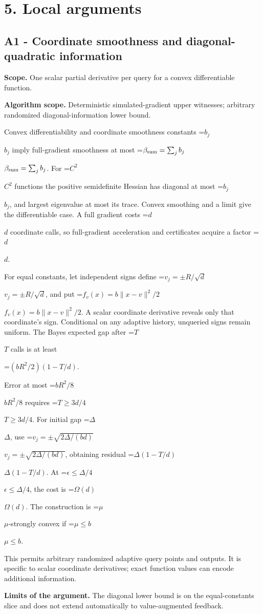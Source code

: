 \documentclass[10pt,a4paper]{article}
\newcommand{\AtlasMath}[1]{\par\begingroup\centering\setbox0=\hbox{$\displaystyle #1$}\ifdim\wd0>1.4\linewidth\typeout{ATLAS WIDE FORMULA: \the\wd0}\fi\ifdim\wd0>\linewidth\resizebox{\linewidth}{!}{\box0}\else\box0\fi\par\endgroup}
\newcommand{\AtlasInlineMath}[1]{\begingroup\setbox0=\hbox{$#1$}\ifdim\wd0>.4\linewidth\endgroup\AtlasMath{#1}\else\endgroup$#1$\fi}
\begin{document}
\section{5. Local arguments}
\subsection{A1 - Coordinate smoothness and diagonal-quadratic information}
\textbf{Scope.} One scalar partial derivative per query for a convex differentiable function.

\textbf{Algorithm scope.} Deterministic simulated-gradient upper witnesses; arbitrary randomized diagonal-information lower bound.

Convex differentiability and coordinate smoothness constants \AtlasInlineMath{b_j} imply full-gradient smoothness at most \AtlasInlineMath{\beta_{\rm sum}=\sum_jb_j}. For \AtlasInlineMath{C^2} functions the positive semidefinite Hessian has diagonal at most \AtlasInlineMath{b_j}, and largest eigenvalue at most its trace. Convex smoothing and a limit give the differentiable case. A full gradient costs \AtlasInlineMath{d} coordinate calls, so full-gradient acceleration and certificates acquire a factor \AtlasInlineMath{d}.

For equal constants, let independent signs define \AtlasInlineMath{v_j=\pm R/\sqrt d}, and put \AtlasInlineMath{f_v(x)=b\|x-v\|^2/2}. A scalar coordinate derivative reveals only that coordinate's sign. Conditional on any adaptive history, unqueried signs remain uniform. The Bayes expected gap after \AtlasInlineMath{T} calls is at least

\AtlasMath{(bR^2/2)(1-T/d).}

Error at most \AtlasInlineMath{bR^2/8} requires \AtlasInlineMath{T\ge3d/4}. For initial gap \AtlasInlineMath{\Delta}, use
\AtlasInlineMath{v_j=\pm\sqrt{2\Delta/(bd)}}, obtaining residual
\AtlasInlineMath{\Delta(1-T/d)}. At \AtlasInlineMath{\epsilon\le\Delta/4}, the cost is \AtlasInlineMath{\Omega(d)}. The construction is \AtlasInlineMath{\mu}-strongly convex if \AtlasInlineMath{\mu\le b}.

This permits arbitrary randomized adaptive query points and outputs. It is specific to scalar coordinate derivatives; exact function values can encode additional information.

\textbf{Limits of the argument.} The diagonal lower bound is on the equal-constants slice and does not extend automatically to value-augmented feedback.
\end{document}
